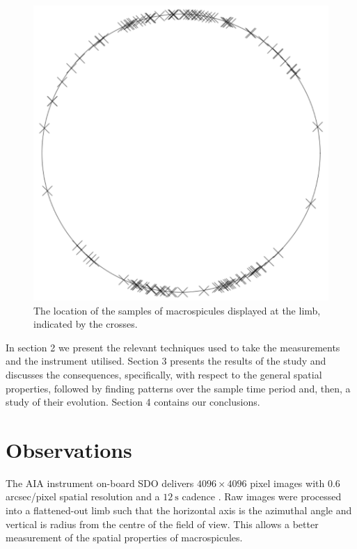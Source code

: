 \begin{figure}[h!]
	\centering
	\includegraphics[scale=0.3]{Chapter3/Figs/polar_demo}
	\caption{\small The location of the samples of macrospicules displayed at the limb, indicated by the crosses.}
	\label{fig:polar-sample}
\end{figure}


In section 2 we present the relevant techniques used to take the measurements and the instrument utilised. Section 3 presents the results of the study and discusses the consequences, specifically, with respect to the general spatial properties, followed by finding patterns over the sample time period and, then, a study of their evolution. Section 4 contains our conclusions.   


\section{Observations}    
The AIA instrument on-board SDO delivers $4096 \times 4096$ pixel images with $0.6$ arcsec/pixel spatial resolution and a $12\ \textrm{s}$ cadence \cite{AIAspec}. Raw images were processed into a flattened-out limb such that the horizontal axis is the azimuthal angle and vertical is radius from the centre of the field of view. This allows a better measurement of the spatial properties of macrospicules.


